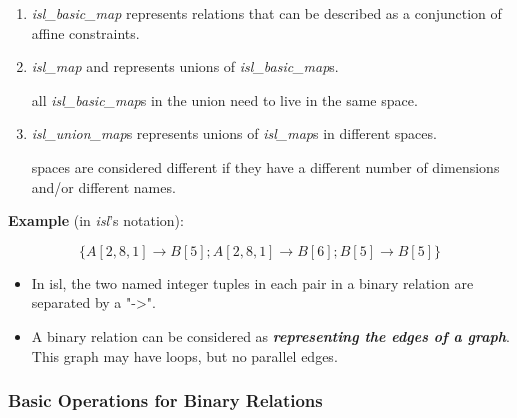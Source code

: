 \begin{enumerate}
  \item \textcolor{pg}{\emph{isl\_basic\_map}} represents relations that can be described as a conjunction of affine constraints.
  \item \textcolor{pg}{\emph{isl\_map}} and represents unions of \textcolor{pg}{\emph{isl\_basic\_map}}s.

    all \textcolor{pg}{\emph{isl\_basic\_map}}s in the union need to live in the same space.

  \item \textcolor{pg}{\emph{isl\_union\_map}}s represents unions of \textcolor{pg}{\emph{isl\_map}}s in different spaces.

    spaces are considered different if they have a different number of dimensions and/or different names.
\end{enumerate}

\textbf{Example} (in \emph{isl}'s notation):

$$\{ A[2,8,1] \rightarrow B[5]; A[2,8,1] \rightarrow B[6]; B[5] \rightarrow B[5] \}$$

\begin{itemize}
  \item In isl, the two named integer tuples in each pair in a binary relation are separated by a "->".
  \item A binary relation can be considered as \textbf{\textit{representing the edges of a graph}}. This graph may have loops, but no parallel edges.
\end{itemize}

\subsubsection{Basic Operations for Binary Relations}

